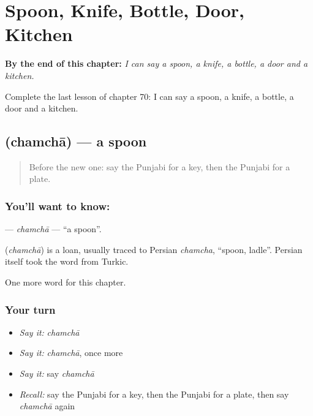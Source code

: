 
\chapter{Spoon, Knife, Bottle, Door, Kitchen}
\label{ch:pa-spoon-knife-bottle-door-kitchen}

\begin{chapteropening}
\textbf{By the end of this chapter:} \emph{I can say a spoon, a knife, a bottle, a door and a kitchen.}

Complete the last lesson of chapter 70: I can say a spoon, a knife, a bottle, a door and a kitchen.
\end{chapteropening}

\section[\texorpdfstring{\pa{ਚਮਚਾ} (chamchā)}{ਚਮਚਾ (chamchā)}]{ (chamchā) — a spoon}

\label{lesson:PA-C70-chamcha}



\begin{quote}
Before the new one: say the Punjabi for a key, then the Punjabi for a plate.
\end{quote}

\subsection*{You'll want to know: }
\textbf{} — \emph{chamchā} — \textquotedblleft{}a spoon\textquotedblright{}.

\begin{cousinweb}
\textbf{} (\emph{chamchā}) is a loan, usually traced to Persian \emph{chamcha}, \textquotedblleft{}spoon, ladle\textquotedblright{}. Persian itself took the word from Turkic.
\end{cousinweb}

\begin{grammarlens}[title={What you've built}]
One more word for this chapter.
\end{grammarlens}

\subsection*{Your turn}
\begin{itemize}
\raggedright
  \item \emph{Say it:} \emph{chamchā}
  \item \emph{Say it:} \emph{chamchā}, once more
  \item \emph{Say it:} say \emph{chamchā}
  \item \emph{Recall:} say the Punjabi for a key, then the Punjabi for a plate, then say \emph{chamchā} again
\end{itemize}

